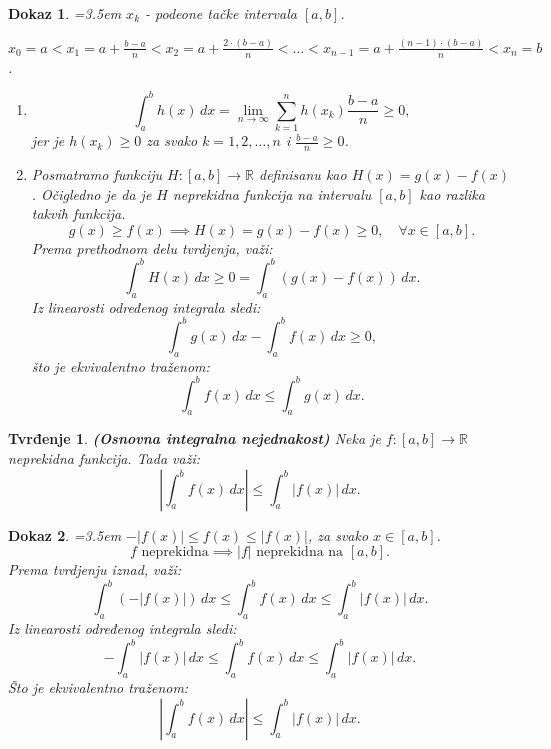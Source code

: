 \documentclass[11pt]{article}
\newcounter{mathitem}
\theoremstyle{plain}
\newtheorem{tvrdjenje}[mathitem]{Tvrđenje}
\theoremstyle{serbnodot}
\newtheorem*{dokaz}{Dokaz}
\begin{document}
\begin{dokaz} \quad
    \par\hangindent=3.5em
    \( x_k \) - podeone tačke intervala \([a,b]\). 

    \( x_0 = a < x_1 = a + \frac{b-a}{n} < x_2 = a + \frac{2 \cdot (b-a)}{n} < \dots < x_{n-1} = a + \frac{(n-1) \cdot (b - a)}{n} < x_n = b\).
    \begin{enumerate}
      \item \[ \int_{a}^{b} h(x) \, dx = \lim_{n \to \infty} \sum_{k=1}^{n} h(x_k) \frac{b-a}{n} \geq 0, \]
      jer je \( h(x_k) \geq 0 \) za svako \( k = 1, 2, \ldots, n \) i \( \frac{b-a}{n} \geq 0 \).
      \item Posmatramo funkciju \( H:[a,b] \to \mathbb{R} \) definisanu kao \( H(x) = g(x) - f(x) \). Očigledno je da je \( H \) neprekidna funkcija na intervalu \([a,b]\) kao razlika takvih funkcija. 
      \[ g(x) \geq f(x) \implies H(x) = g(x) - f(x) \geq 0, \quad \forall x \in [a,b]. \]
      Prema prethodnom delu tvrdjenja, važi:
      \[ \int_{a}^{b} H(x) \, dx \geq 0 = \int_{a}^{b} (g(x) - f(x)) \, dx. \]
      Iz linearosti određenog integrala sledi:
      \[
        \int_{a}^{b} g(x) \, dx - \int_{a}^{b} f(x) \, dx \geq 0,
      \]
      što je ekvivalentno traženom:
      \[
        \int_{a}^{b} f(x) \, dx \leq \int_{a}^{b} g(x) \, dx.
      \]

    \end{enumerate}
\end{dokaz}

\begin{tvrdjenje} \textbf{(Osnovna integralna nejednakost)}
  Neka je \( f:[a,b] \to \mathbb{R} \) neprekidna funkcija. Tada važi:
  \[
    \left| \int_{a}^{b} f(x) \, dx \right| \leq \int_{a}^{b} |f(x)| \, dx.
  \]
\end{tvrdjenje}
\begin{dokaz} \quad
    \par\hangindent=3.5em
    \( -|f(x)| \leq f(x) \leq |f(x)| \), za svako \( x \in [a,b] \).
    \[
      f \text{ neprekidna} \implies |f|  \text{ neprekidna na } [a,b].
    \]
    Prema tvrdjenju iznad, važi:
    \[
      \int_{a}^{b} (-|f(x)|) \, dx \leq \int_{a}^{b} f(x) \, dx \leq \int_{a}^{b} |f(x)| \, dx.
    \]
    Iz linearosti određenog integrala sledi:
    \[
      -\int_{a}^{b} |f(x)| \, dx \leq \int_{a}^{b} f(x) \, dx \leq \int_{a}^{b} |f(x)| \, dx.
    \]
    Što je ekvivalentno traženom:
    \[
      \left| \int_{a}^{b} f(x) \, dx \right| \leq \int_{a}^{b} |f(x)| \, dx.
    \]
    \end{dokaz}
\end{document}
